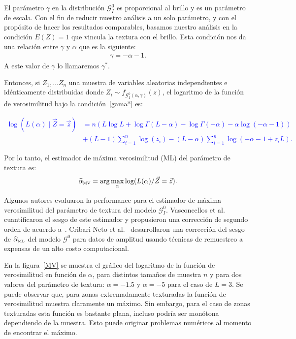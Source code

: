 El parámetro $\gamma$ en la distribución $\mathcal{G}_I^0$  es proporcional al brillo y es un parámetro de escala. Con el fin de reducir nuestro análisis a un solo parámetro, y con el propósito de hacer los resultados comparables, basamos nuestro análisis en la condición $E(Z)=1$ que vincula la textura con el brillo. Esta condición nos da una relación entre $\gamma$ y $\alpha$ que es la siguiente:
\begin{align}
\label{gama*}
\gamma=-\alpha-1. 
\end{align}
A este valor de $\gamma$ lo llamaremos $\gamma^*$.

Entonces, si $Z_1,\ldots Z_n$ una muestra de variables aleatorias independientes e idénticamente distribuidas donde $Z_i \sim f_{\mathcal G_I^0(\alpha,\gamma)}(z)$,  el logaritmo de la función de verosimilitud bajo la condición~\eqref{gama*} es:

\textcolor{blue}{
\begin{align}
\nonumber \log (L(\alpha) \mid \vec{Z}=\vec{z})&=n(L \log L+\log \Gamma(L-\alpha)-\log \Gamma(-\alpha) -\alpha \log(-\alpha-1))\\
& + (L-1) \sum_{i=1}^n \log(z_i)-(L-\alpha) \sum_{i=1}^n\log(-\alpha-1+z_i L).
\end{align}
}

Por lo tanto, el estimador de máxima verosimilitud (ML) del parámetro de textura es:
\begin{align}
\widehat{\alpha}_{{\text{\tiny{MV}}}}=\arg\max_{\alpha} \log(L(\alpha)/\vec{Z}=\vec{z}).
\end{align}

Algunos autores evaluaron la performance para el estimador de máxima verosimilitud del parámetro de textura del modelo  $\mathcal G_I^0$. Vasconcellos et al.~\cite{VasconcellosFrerySilva:CompStat} cuantificaron el sesgo de este estimador y propusieron una corrección de segundo orden de acuerdo a~\cite{cox1968}. Cribari-Neto et al.~\cite{CribariFrerySilva:CSDA} desarrollaron una corrección del sesgo de $\widehat{\alpha}_{\text{{\text{\tiny{ML}}}}}$ del modelo $\mathcal G^0$ para datos de amplitud usando técnicas de remuestreo a expensas de un alto costo computacional.

En la figura~\ref{MV} se muestra el gráfico del logaritmo de la función de verosimilitud en función de $\alpha$, para distintos tamaños de muestra $n$ y para dos valores del parámetro de textura: $\alpha=-1.5$ y $\alpha=-5$ para el caso de $L=3$. Se puede observar que, para zonas extremadamente texturadas la función de verosimilitud muestra claramente un máximo. Sin embargo, para el caso de zonas texturadas esta función es bastante plana, incluso podría ser monótona dependiendo de la muestra. Esto puede originar problemas numéricos al momento de encontrar el máximo.  

